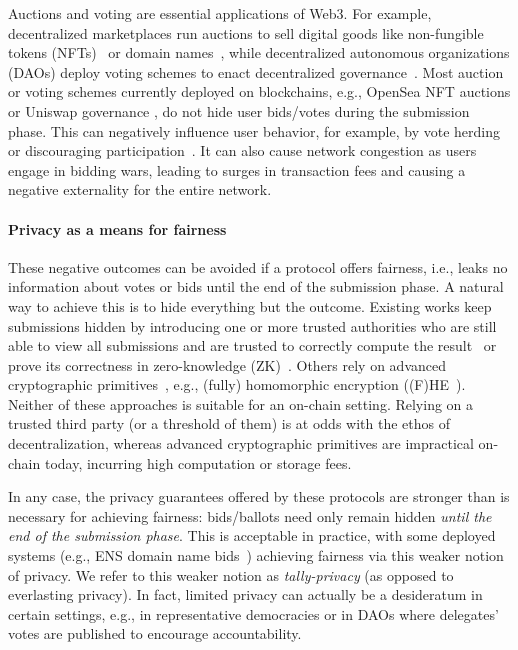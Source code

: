 Auctions and voting are essential applications of Web3. For example, decentralized marketplaces run auctions to sell digital goods like non-fungible tokens (NFTs)~\cite{opensea_auction} or domain names~\cite{ARXIV:XWYLLX21}, while decentralized autonomous organizations (DAOs) deploy voting schemes to enact decentralized governance~\cite{optimismgov,ARXIV:FFHVW24}. Most auction or voting schemes currently deployed on blockchains, e.g., OpenSea NFT auctions or Uniswap governance \cite{ARXIV:FriMulWat22}, do not hide user bids/votes during the submission phase. This can negatively influence user behavior, for example, by vote herding or discouraging participation~\cite{FC:ElkLip04,WTSC:GalYou18,FC:SuzYok03}. It can also cause network congestion as users engage in bidding wars, leading to surges in transaction fees and causing a negative externality for the entire network.

\paragraph{Privacy as a means for fairness}
These negative outcomes can be avoided if a protocol offers fairness, i.e., leaks no information about votes or bids until the end of the submission phase. A natural way to achieve this is to hide everything but the outcome. Existing works keep submissions hidden by introducing one or more trusted authorities who are still able to view all submissions and are trusted to correctly compute the result~\cite{FC:BCDGJK09,C:AOZZ15} or prove its correctness in zero-knowledge (ZK)~\cite{USENIX:Adida08,maci,plume,rln}. 
Others rely on advanced cryptographic primitives~\cite{PQCRYPTO:CGGI16,CCS:DLNS17}, e.g., (fully) homomorphic encryption ((F)HE~\cite{STOC:Gentry09}). 
Neither of these approaches is suitable for an on-chain setting. Relying on a trusted third party (or a threshold of them) is at odds with the ethos of decentralization, whereas advanced cryptographic primitives are impractical on-chain today, incurring high computation or storage fees.

In any case, the privacy guarantees offered by these protocols are stronger than is necessary for achieving fairness: bids/ballots need only remain hidden \emph{until the end of the submission phase}. This is acceptable in practice, with some deployed systems (e.g., ENS domain name bids~\cite{ARXIV:XWYLLX21}) achieving fairness via this weaker notion of privacy. We refer to this weaker notion as \emph{tally-privacy} (as opposed to everlasting privacy).
In fact, limited privacy can actually be a desideratum in certain settings, e.g., in representative democracies or in DAOs where delegates' votes are published to encourage accountability.

